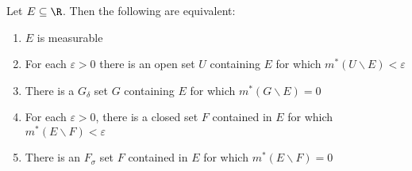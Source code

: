 \begin{theorem}
    Let $E\subseteq\R$. Then the following are equivalent: 
    \begin{enumerate}[label=(\alph*)]
        \item $E$ is measurable
        \item For each $\varepsilon > 0$ there is an open set $U$ containing $E$ for which $m^*(U\backslash E) < \varepsilon$ 
        \item There is a $G_\delta$ set $G$ containing $E$ for which $m^*(G\backslash E) = 0$ 
        \item For each $\varepsilon > 0$, there is a closed set $F$ contained in $E$ for which $m^*(E\backslash F) < \varepsilon$
        \item There is an $F_\sigma$ set $F$ contained in $E$ for which $m^*(E\backslash F) = 0$
    \end{enumerate}
\end{theorem}
